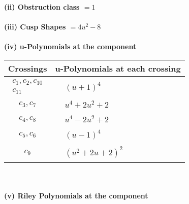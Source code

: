\documentclass[1p]{elsarticle_modified}
\theoremstyle{definition}
\begin{document}
\flushleft \textbf{(ii) Obstruction class $= 1$}\\~\\
\flushleft \textbf{(iii) Cusp Shapes $= 4 u^2-8$}\\~\\
\newpage\renewcommand{\arraystretch}{1}
\flushleft \textbf{(iv) u-Polynomials at the component}\newline \\
\begin{tabular}{m{50pt}|m{274pt}}
Crossings & \hspace{64pt}u-Polynomials at each crossing \\
\hline $$\begin{aligned}c_{1},c_{2},c_{10}\\c_{11}\end{aligned}$$&$\begin{aligned}
&(u+1)^4
\end{aligned}$\\
\hline $$\begin{aligned}c_{3},c_{7}\end{aligned}$$&$\begin{aligned}
&u^4+2 u^2+2
\end{aligned}$\\
\hline $$\begin{aligned}c_{4},c_{8}\end{aligned}$$&$\begin{aligned}
&u^4-2 u^2+2
\end{aligned}$\\
\hline $$\begin{aligned}c_{5},c_{6}\end{aligned}$$&$\begin{aligned}
&(u-1)^4
\end{aligned}$\\
\hline $$\begin{aligned}c_{9}\end{aligned}$$&$\begin{aligned}
&(u^2+2 u+2)^2
\end{aligned}$\\
\hline
\end{tabular}\\~\\
\newpage\renewcommand{\arraystretch}{1}
\flushleft \textbf{(v) Riley Polynomials at the component}\newline \\
\end{document}

